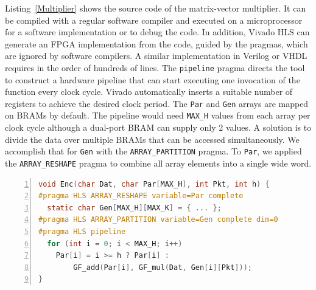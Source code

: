 Listing~\ref{Multiplier} shows the source code of the
matrix-vector multiplier. %
It can be compiled with a regular software
compiler and executed on a microprocessor
for a software implementation or to debug the code.
In addition, Vivado HLS can generate an FPGA implementation
from the code, guided by the pragmas, which are ignored by software compilers.
A similar implementation in Verilog or VHDL requires in the order of hundreds
of lines.  The {\tt pipeline} pragma directs the tool to construct a
hardware pipeline that can start executing one invocation of the function
every clock cycle.  Vivado automatically inserts a suitable number of registers
to achieve the desired clock period.  The {\tt Par} and {\tt Gen} arrays are mapped
on BRAMs by default.  The pipeline would need {\tt MAX\_H} values from each
array per clock cycle although a dual-port BRAM can supply only 2 values.
A solution is to divide the data over multiple BRAMs that can be
accessed simultaneously.  We accomplish that for {\tt Gen} with the {\tt ARRAY\_PARTITION}
pragma.  To {\tt Par}, we applied the {\tt ARRAY\_RESHAPE} pragma to combine
all array elements into a single wide word.

\begin{lstlisting}[language=C,basicstyle=\footnotesize,numbers=left,
                   captionpos=b,caption={Matrix-Vector Multiplier},
                   label=Multiplier]
void Enc(char Dat, char Par[MAX_H], int Pkt, int h) {
#pragma HLS ARRAY_RESHAPE variable=Par complete
  static char Gen[MAX_H][MAX_K] = { ... };
#pragma HLS ARRAY_PARTITION variable=Gen complete dim=0
#pragma HLS pipeline
  for (int i = 0; i < MAX_H; i++)
    Par[i] = i >= h ? Par[i] :
        GF_add(Par[i], GF_mul(Dat, Gen[i][Pkt]));
}
\end{lstlisting}

